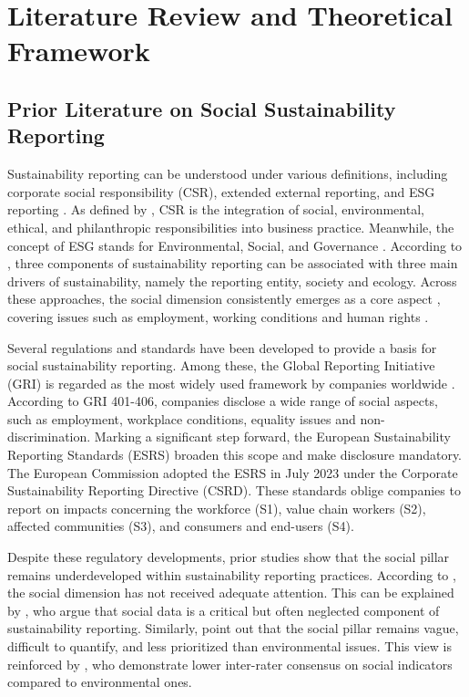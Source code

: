 \chapter{Literature Review and Theoretical Framework}
\label{chap:background}
\section{Prior Literature on Social Sustainability Reporting}

Sustainability reporting can be understood under various definitions, 
including corporate social responsibility (CSR), extended external reporting, 
and ESG reporting \parencite{Edge2022}. As defined by \parencite{Rasche2017}, CSR is the integration of social, 
environmental, ethical, and philanthropic responsibilities into business practice. 
Meanwhile, the concept of ESG stands for Environmental, Social, and Governance \parencite{UNGlobal2024}.
According to \parencite{Krivogorsky2024}, three components of sustainability reporting 
can be associated with three main drivers of sustainability, namely the reporting entity, 
society and ecology. Across these approaches, the social dimension consistently emerges 
as a core aspect \parencite{Rasche2017, UNGlobal2024, Krivogorsky2024}, covering issues 
such as employment, working conditions and human rights \parencite{Fiechter2022, Morais2018}.

Several regulations and standards have been developed to provide a basis for social sustainability reporting.
Among these, the Global Reporting Initiative (GRI) is regarded as the most widely used framework 
by companies worldwide \parencite{Bais2024, vanOorschot2024}. 
According to GRI 401-406, companies disclose a wide range of social aspects, such as employment,
workplace conditions, equality issues and non-discrimination.
Marking a significant step forward, the European Sustainability Reporting Standards (ESRS) 
broaden this scope and make disclosure mandatory. The European Commission adopted the ESRS 
in July 2023 under the Corporate Sustainability Reporting Directive (CSRD). These standards 
oblige companies to report on impacts concerning the workforce (S1), value chain workers (S2), 
affected communities (S3), and consumers and end-users (S4).

Despite these regulatory developments, prior studies show that the social pillar remains underdeveloped 
within sustainability reporting practices. According to \textcite{Heldal2024}, the social dimension 
has not received adequate attention. This can be explained by \textcite{Sharma2024}, who argue that
social data is a critical but often neglected component of sustainability reporting. Similarly, 
\textcite{Morais2018} point out that the social pillar remains vague, difficult to quantify, 
and less prioritized than environmental issues. This view is reinforced by \textcite{Berg2022}, 
who demonstrate lower inter-rater consensus on social indicators compared to environmental ones.

